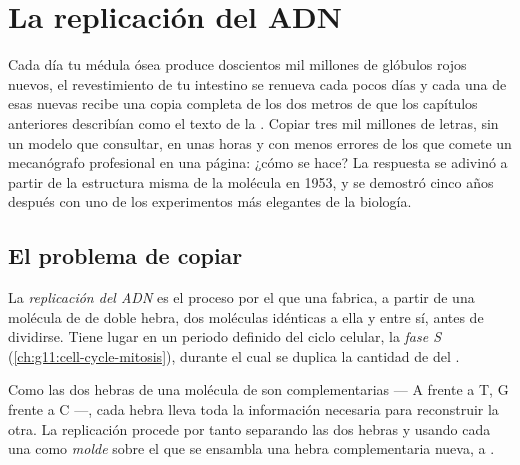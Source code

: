 \chapter{La replicación del ADN}\label{ch:g11:dna-replication}

Cada día tu médula ósea produce doscientos mil millones de glóbulos
rojos nuevos, el revestimiento de tu intestino se renueva cada pocos
días y cada una de esas  nuevas recibe una copia completa de los
dos metros de  que los capítulos anteriores describían como el texto
de la . Copiar tres mil millones de letras, sin un modelo que
consultar, en unas horas y con menos errores de los que comete un
mecanógrafo profesional en una página: ¿cómo se hace? La respuesta se
adivinó a partir de la estructura misma de la molécula en 1953, y se
demostró cinco años después con uno de los experimentos más elegantes
de la biología.

\section{El problema de copiar}

\begin{definition}[Replicación]\label{def:g11:dna-replication:replication}
La \emph{replicación del ADN} es el proceso
por el que una  fabrica, a partir de una molécula de  de doble
hebra, dos moléculas idénticas a ella y entre sí, antes de dividirse.
Tiene lugar en un periodo definido del ciclo celular, la \emph{fase S}
(\cref{ch:g11:cell-cycle-mitosis}), durante el cual se duplica la
cantidad de  del .
\end{definition}

\begin{proposition}\label{prop:g11:dna-replication:template}
Como las dos hebras de una molécula de  son complementarias --- A
frente a T, G frente a C ---, cada hebra lleva toda la información
necesaria para reconstruir la otra. La replicación procede por tanto
separando las dos hebras y usando cada una como \emph{molde} sobre el
que se ensambla una hebra complementaria nueva,  a
.
\end{proposition}
\admitted

